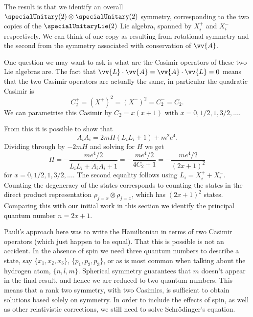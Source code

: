 \documentclass[fleqn]{NotesClass}
\newcommand*{\directproduct}{\otimes}
\begin{document}
    The result is that we identify an overall \(\specialUnitary(2) \directproduct \specialUnitary(2)\) symmetry, corresponding to the two copies of the \(\specialUnitaryLie(2)\) Lie algebra, spanned by \(X_i^+\) and \(X_i^-\) respectively.
    We can think of one copy as resulting from rotational symmetry and the second from the symmetry associated with conservation of \(\vv{A}\).
    
    One question we may want to ask is what are the Casimir operators of these two Lie algebras are.
    The fact that \(\vv{L} \cdot \vv{A} = \vv{A} \cdot \vv{L} = 0\) means that the two Casimir operators are actually the same, in particular the quadratic Casimir is
    \begin{equation}
        C_2^+ = (X^+)^2 = (X^-)^2 = C_2^- = C_2.
    \end{equation}
    We can parametrise this Casimir by \(C_2 = x(x + 1)\) with \(x = 0, 1/2, 1, 3/2, \dotsc\).
    
    From this it is possible to show that
    \begin{equation}
        A_iA_i = 2mH(L_iL_i + 1) + m^2e^4.
    \end{equation}
    Dividing through by \(-2mH\) and solving for \(H\) we get
    \begin{equation}
        H = -\frac{me^4/2}{L_iL_i + \tilde{A}_i\tilde{A}_i + 1} = -\frac{me^4/2}{4C_2 + 1} = -\frac{me^4/2}{(2x + 1)^2}
    \end{equation}
    for \(x = 0, 1/2, 1, 3/2, \dotsc\).
    The second equality follows using \(L_i = X_i^+ + X_i^-\).
    Counting the degeneracy of the states corresponds to counting the states in the direct product representation \(\rho_{j = x} \directproduct \rho_{j = x}\), which has \((2x + 1)^2\) states.
    Comparing this with our initial work in this section we identify the principal quantum number \(n = 2x + 1\).
    
    Pauli's approach here was to write the Hamiltonian in terms of two Casimir operators (which just happen to be equal).
    That this is possible is not an accident.
    In the absence of spin we need three quantum numbers to describe a state, say \(\{x_1, x_2, x_3\}\), \(\{p_1, p_2, p_3\}\), or as is most common when talking about the hydrogen atom, \(\{n, l, m\}\).
    Spherical symmetry guarantees that \(m\) doesn't appear in the final result, and hence we are reduced to two quantum numbers.
    This means that a rank two symmetry, with two Casimirs, is sufficient to obtain solutions based solely on symmetry.
    In order to include the effects of spin, as well as other relativistic corrections, we still need to solve Schrödinger's equation.
    
    
    
    
    \appendixpage
    \begin{appendices}
        
        
        
        
    \end{appendices}
    
    \backmatter
    \renewcommand{\glossaryname}{Acronyms}
    \printglossary[acronym]
    \printindex
\end{document}
